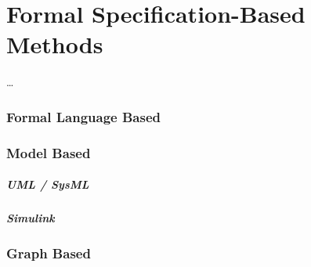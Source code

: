 \chapter{Formal Specification-Based Methods}
\label{sec:formal_methods}

\dots

\subsection{Formal Language Based}



\subsection{Model Based}

\paragraph{UML / SysML}

\paragraph{Simulink}

\subsection{Graph Based}